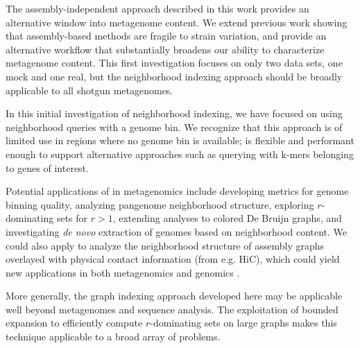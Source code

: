 The assembly-independent approach described in this work provides an
alternative window into metagenome content. We extend previous work
showing that assembly-based methods are fragile to strain
variation, and provide an alternative workflow that substantially
broadens our ability to characterize metagenome content.  This first
investigation focuses on only two data sets, one mock and one real, but
the neighborhood indexing approach should be broadly applicable to
all shotgun metagenomes.

In this initial investigation of neighborhood indexing, we have
focused on using neighborhood queries with a genome bin.  We recognize
that this approach is of limited use in regions where no genome bin is
available; \sgc is flexible and performant enough to support
alternative approaches such as querying with k-mers belonging to genes
of interest.

Potential applications of \sgc in metagenomics include developing
metrics for genome binning quality, analyzing pangenome neighborhood
structure, exploring $r$-dominating sets for $r > 1$, extending analyses
to colored De Bruijn graphs, and investigating {\em de novo}
extraction of genomes based on neighborhood content.  We could also
apply \sgc to analyze the neighborhood structure of assembly graphs
overlayed with physical contact information (from e.g. HiC), which could
yield new applications in both metagenomics and genomics
\cite{Marbouty2014,Beitel2014}.

More generally, the graph indexing approach developed here may be
applicable well beyond metagenomes and sequence analysis.  The
exploitation of bounded expansion to efficiently compute $r$-dominating
sets on large graphs makes this technique applicable to a broad array
of problems.
